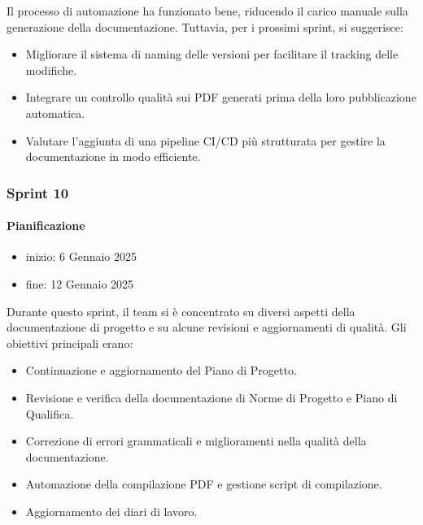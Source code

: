 \documentclass{article}
\begin{document}
                Il processo di automazione ha funzionato bene, riducendo il carico manuale sulla generazione della documentazione. Tuttavia, per i prossimi sprint, si suggerisce:
                \begin{itemize}
                    \item Migliorare il sistema di naming delle versioni per facilitare il tracking delle modifiche.
                    \item Integrare un controllo qualità sui PDF generati prima della loro pubblicazione automatica.
                    \item Valutare l'aggiunta di una pipeline CI/CD più strutturata per gestire la documentazione in modo efficiente.
                \end{itemize}
            \subsubsection{Sprint 10}
                \paragraph{Pianificazione}
                \begin{itemize}
                    \item inizio: 6 Gennaio 2025
                    \item fine: 12 Gennaio 2025
                \end{itemize}
                Durante questo sprint, il team si è concentrato su diversi aspetti della documentazione di progetto e su alcune revisioni e aggiornamenti di qualità. Gli obiettivi principali erano:
                \begin{itemize}
                    \item Continuazione e aggiornamento del Piano di Progetto.
                    \item Revisione e verifica della documentazione di Norme di Progetto e Piano di Qualifica.
                    \item Correzione di errori grammaticali e miglioramenti nella qualità della documentazione.
                    \item Automazione della compilazione PDF e gestione script di compilazione.
                    \item Aggiornamento dei diari di lavoro.
                \end{itemize}
\end{document}
